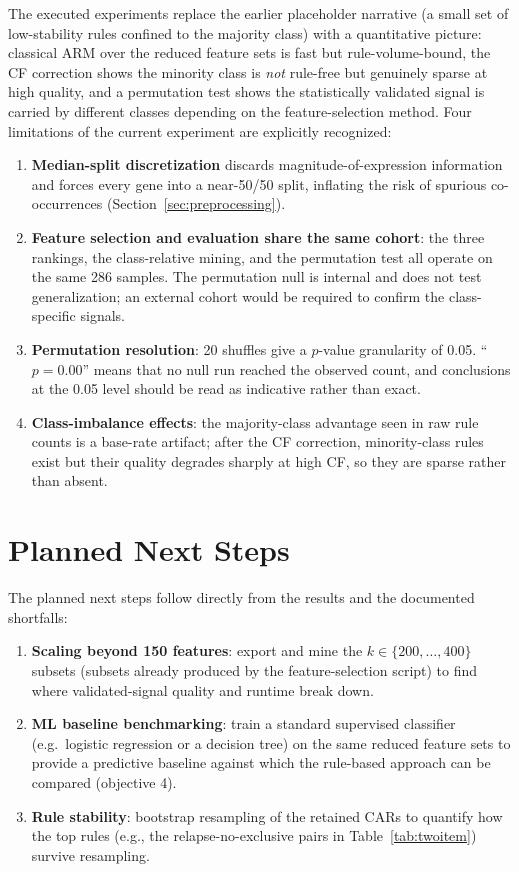 \documentclass[twocolumn]{article}
\begin{document}
The executed experiments replace the earlier placeholder narrative (a small
set of low-stability rules confined to the majority class) with a
quantitative picture: classical ARM over the reduced feature sets is fast but
rule-volume-bound, the CF correction shows the minority class is \emph{not}
rule-free but genuinely sparse at high quality, and a permutation test shows
the statistically validated signal is carried by different classes depending
on the feature-selection method. Four limitations of the current experiment
are explicitly recognized:

\begin{enumerate}
    \item \textbf{Median-split discretization} discards magnitude-of-expression
    information and forces every gene into a near-50/50 split, inflating the
    risk of spurious co-occurrences (Section~\ref{sec:preprocessing}).
    \item \textbf{Feature selection and evaluation share the same cohort}: the
    three rankings, the class-relative mining, and the permutation test all
    operate on the same 286 samples. The permutation null is internal and does
    not test generalization; an external cohort would be required to confirm
    the class-specific signals.
    \item \textbf{Permutation resolution}: 20 shuffles give a $p$-value
    granularity of 0.05. ``$p = 0.00$'' means that no null run reached the
    observed count, and conclusions at the 0.05 level should be read as
    indicative rather than exact.
    \item \textbf{Class-imbalance effects}: the majority-class advantage seen
    in raw rule counts is a base-rate artifact; after the CF correction,
    minority-class rules exist but their quality degrades sharply at high CF,
    so they are sparse rather than absent.
\end{enumerate}

\section{Planned Next Steps}

The planned next steps follow directly from the results and the documented
shortfalls:

\begin{enumerate}
    \item \textbf{Scaling beyond 150 features}: export and mine the
    $k \in \{200,\ldots,400\}$ subsets (subsets already produced by the
    feature-selection script) to find where validated-signal quality and
    runtime break down.
    \item \textbf{ML baseline benchmarking}: train a standard supervised
    classifier (e.g.\ logistic regression or a decision tree) on the same
    reduced feature sets to provide a predictive baseline against which the
    rule-based approach can be compared (objective 4).
    \item \textbf{Rule stability}: bootstrap resampling of the retained CARs to
    quantify how the top rules (e.g., the relapse-no-exclusive pairs in
    Table~\ref{tab:twoitem}) survive resampling.
\end{enumerate}
\end{document}
